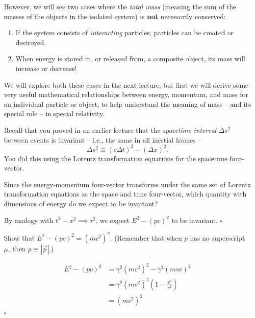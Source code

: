 \documentclass[11pt, letterpaper, openany]{book}
\newenvironment{exercise}[1][Exercise]{%
  \tcolorbox[blanker, breakable, left=1em,
    before skip=1em, after skip=1em,
    borderline west={3pt}{0pt}{PhysNavy},
    colback=PhysCream,
    before upper={\textcolor{PhysNavy}{\sffamily\bfseries #1:}\space}
  ]%
}{%
  \endtcolorbox%
}
\newenvironment{solution}[1][Solution]{%
  \tcolorbox[blanker, breakable, left=1em,
    before skip=1em, after skip=1em,
    borderline west={2pt}{0pt}{PhysTeal},
    colback=PhysCream,
    before upper={\textcolor{PhysTeal}{\sffamily\bfseries #1.}\space}
  ]%
}{%
  \hfill\textcolor{PhysTeal}{\ensuremath{\square}}\endtcolorbox%
}
\begin{document}
However, we will see two cases where the \textit{total mass} (meaning the sum of the masses of the objects in the isolated system) is \textbf{not} necessarily conserved:
\begin{enumerate}
    \item If the system consists of \textit{interacting} particles, particles can be created or destroyed.
    \item When energy is stored in, or released from, a composite object, its mass will increase or decrease!
\end{enumerate}

We will explore both these cases in the next lecture, but first we will derive some very useful mathematical relationships between energy, momentum, and mass for an individual particle or object, to help understand the meaning of mass -- and its special role -- in special relativity.

Recall that you proved in an earlier lecture that the \textit{spacetime interval} $\Delta s^2$ between events is invariant -- i.e., the same in all inertial frames --
\[ \Delta s^2 \equiv (c\Delta t)^2 - (\Delta x)^2. \]
You did this using the Lorentz transformation equations for the spacetime four-vector.

\begin{exercise}[Quick question]
Since the energy-momentum four-vector transforms under the same set of Lorentz transformation equations as the space and time four-vector, which quantity with dimensions of energy do we expect to be invariant?
\end{exercise}
\begin{solution}
By analogy with $t^2 - x^2 \implies \tau^2$, we expect $E^2 - (pc)^2$ to be invariant.
\end{solution}

\begin{exercise}[Exercise 2 (A very important result!!)]
Show that $E^2 - (pc)^2 = (mc^2)^2$. (Remember that when $p$ has no superscript $\mu$, then $p \equiv |\vec{p}|$.)
\end{exercise}
\begin{solution}
\begin{align*}
    E^2 - (pc)^2 &= \gamma^2(mc^2)^2 - \gamma^2(mvc)^2 \\
    &= \gamma^2(mc^2)^2 \left(1 - \frac{v^2}{c^2}\right) \\
    &= (mc^2)^2 \tag*{since $\gamma^2(1-v^2/c^2) = 1$}
\end{align*}
\end{solution}
\end{document}
